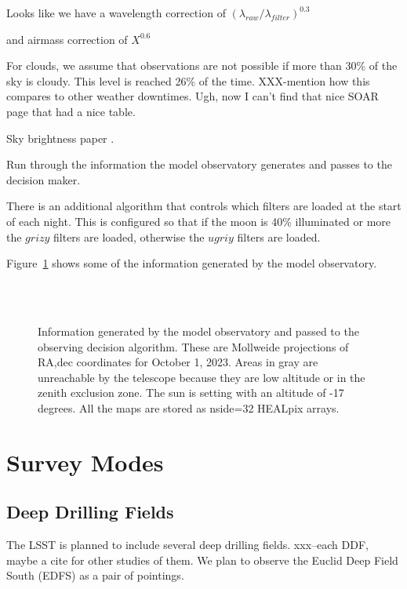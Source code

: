 \documentclass[]{aastex631}
\begin{document}
Looks like we have a wavelength correction of $(\lambda_{raw}/\lambda_{filter})^{0.3}$

and airmass correction of $X^{0.6}$

For clouds, we assume that observations are not possible if more than 30\% of the sky is cloudy. This level is reached 26\% of the time. XXX-mention how this compares to other weather downtimes. Ugh, now I can't find that nice SOAR page that had a nice table.

Sky brightness paper \citep{Yoachim2016}. 


Run through the information the model observatory generates and passes to the decision maker.

There is an additional algorithm that controls which filters are loaded at the start of each night. This is configured so that if the moon is 40\% illuminated or more the $grizy$ filters are loaded, otherwise the $ugriy$ filters are loaded.

Figure~\ref{fig:conditions} shows some of the information generated by the model observatory. 

\begin{figure}
     \\
     \\
    \caption{Information generated by the model observatory and passed to the observing decision algorithm. These are Mollweide projections of RA,dec coordinates for October 1, 2023. Areas in gray are unreachable by the telescope because they are low altitude or in the zenith exclusion zone. The sun is setting with an altitude of -17 degrees. All the maps are stored as nside=32 HEALpix arrays. }
    \label{fig:conditions}
\end{figure}

\section{Survey Modes}


\subsection{Deep Drilling Fields}
The LSST is planned to include several deep drilling fields. xxx--each DDF, maybe a cite for other studies of them. We plan to observe the Euclid Deep Field South (EDFS) as a pair of pointings. 
\end{document}
